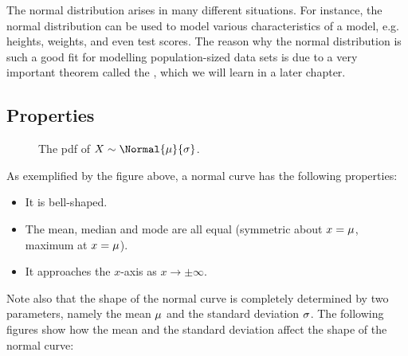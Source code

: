 The normal distribution arises in many different situations. For instance, the normal distribution can be used to model various characteristics of a model, e.g. heights, weights, and even test scores. The reason why the normal distribution is such a good fit for modelling population-sized data sets is due to a very important theorem called the , which we will learn in a later chapter.

\subsection{Properties}

\begin{figure}[H]
    \centering
    \caption{The pdf of $X \sim \Normal{\m}{\s}$.}
\end{figure}

As exemplified by the figure above, a normal curve has the following properties:
\begin{itemize}
    \item It is bell-shaped.
    \item The mean, median and mode are all equal (symmetric about $x = \mu$, maximum at $x = \mu$).
    \item It approaches the $x$-axis as $x \to \pm \infty$.
\end{itemize}

Note also that the shape of the normal curve is completely determined by two parameters, namely the mean $\mu$ and the standard deviation $\sigma$. The following figures show how the mean and the standard deviation affect the shape of the normal curve:

